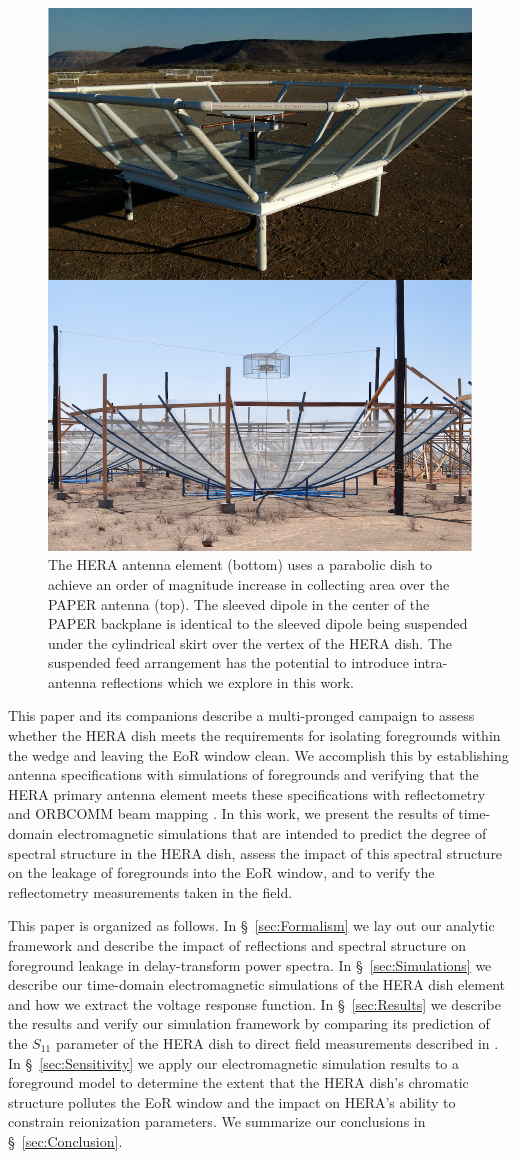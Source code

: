 \documentclass[twocolumn]{emulateapj}
\begin{document}
\begin{figure}
\includegraphics[width=.5\textwidth]{figures/PAPER_HERA_compare.jpg}
\caption{The HERA antenna element (bottom) uses a parabolic dish to achieve an order of magnitude increase in collecting area over the PAPER antenna (top). The sleeved dipole in the center of the PAPER backplane is identical to the sleeved dipole being suspended under the cylindrical skirt over the vertex of the HERA dish. The suspended feed arrangement has the potential to introduce intra-antenna reflections which we explore in this work.}
\label{fig:AntennaCompare}
\end{figure}


This paper and its companions \citep{Neben:2016,Patra:2016,Thyagarajan:2016} describe a multi-pronged campaign to assess whether the HERA dish meets the requirements for isolating foregrounds within the wedge and leaving the EoR window clean. We accomplish this by establishing antenna specifications with simulations of foregrounds \citep{Thyagarajan:2016} and verifying that the HERA primary antenna element meets these specifications with reflectometry \citep{Patra:2016} and ORBCOMM beam mapping \citep{Neben:2016}. In this work, we present the results of time-domain electromagnetic simulations that are intended to predict the degree of spectral structure in the HERA dish, assess the impact of this spectral structure on the leakage of foregrounds into the EoR window, and to verify the reflectometry measurements taken in the field. 

This paper is organized as follows. In \S~\ref{sec:Formalism} we lay out our analytic framework and describe the impact of reflections and spectral structure on foreground leakage in delay-transform power spectra. In \S~\ref{sec:Simulations} we describe our time-domain electromagnetic simulations of the HERA dish element and how we extract the voltage response function. In \S~\ref{sec:Results} we describe the results and verify our simulation framework by comparing its prediction of the $S_{11}$ parameter of the HERA dish to direct field measurements described in \citep{Patra:2016}. In \S~\ref{sec:Sensitivity} we apply our electromagnetic simulation results to a foreground model to determine the extent that the HERA dish's chromatic structure pollutes the EoR window and the impact on HERA's ability to constrain reionization parameters. We summarize our conclusions in \S~\ref{sec:Conclusion}.
\end{document}
